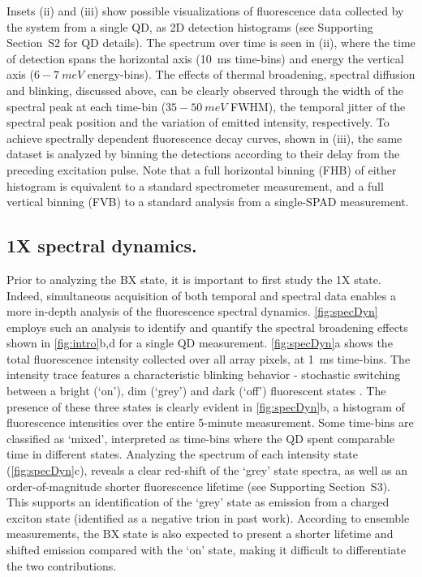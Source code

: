 \documentclass[journal=nalefd, manuscript=letter, layout=twocolumn]{achemso}
\newcommand{\supp}[1]{Supporting Section~S#1}
\begin{document}
Insets (ii) and (iii) show possible visualizations of fluorescence data collected by the system from a single QD, as 2D detection histograms (see \supp{2} for QD details). The spectrum over time is seen in (ii), where the time of detection spans the horizontal axis (\SI{10}{ms} time-bins) and energy the vertical axis ($6{-}\SI{7}{meV}$ energy-bins). The effects of thermal broadening, spectral diffusion and blinking, discussed above, can be clearly observed through the width of the spectral peak at each time-bin ($35{-}\SI{50}{meV}$ FWHM), the temporal jitter of the spectral peak position and the variation of emitted intensity, respectively. To achieve spectrally dependent fluorescence decay curves, shown in (iii), the same dataset is analyzed by binning the detections according to their delay from the preceding excitation pulse. Note that a full horizontal binning (FHB) of either histogram is equivalent to a standard spectrometer measurement, and a full vertical binning (FVB) to a standard analysis from a single-SPAD measurement. 

\subsection*{1X spectral dynamics.}
Prior to analyzing the BX state, it is important to first study the 1X state.
Indeed, simultaneous acquisition of both temporal and spectral data enables a more in-depth analysis of the fluorescence spectral dynamics. 
\autoref{fig:specDyn} employs such an analysis to identify and quantify the spectral broadening effects shown in \autoref{fig:intro}b,d for a single QD measurement. \autoref{fig:specDyn}a shows the total fluorescence intensity collected over all array pixels, at \SI{1}{ms} time-bins. The intensity trace features a characteristic blinking behavior - stochastic switching between a bright (`on'), dim (`grey') and dark (`off') fluorescent states \cite{Spinicelli2009,Tenne2013}. The presence of these three states is clearly evident in \autoref{fig:specDyn}b, a histogram of fluorescence intensities over the entire 5-minute measurement. Some time-bins are classified as `mixed', interpreted as time-bins where the QD spent comparable time in different states. Analyzing the spectrum of each intensity state (\autoref{fig:specDyn}c), reveals a clear red-shift of the `grey' state spectra, as well as an order-of-magnitude shorter fluorescence lifetime (see \supp{3}). This supports an identification of the `grey' state as emission from a charged exciton state (identified as a negative trion in past work\cite{Tenne2013}). According to ensemble measurements, the BX state is also expected to present a shorter lifetime and shifted emission compared with the `on' state, making it difficult to differentiate the two contributions.
\end{document}
